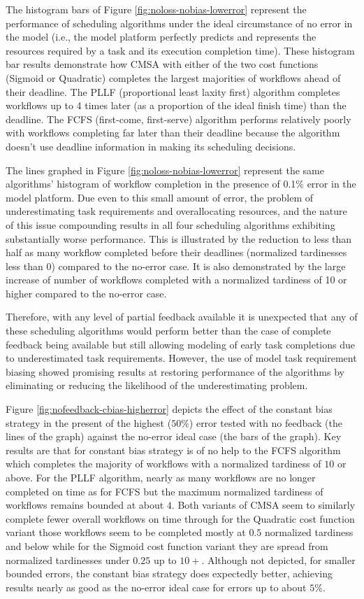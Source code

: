 \documentclass[10pt]{csce}
\begin{document}
The histogram bars of Figure \ref{fig:noloss-nobias-lowerror} represent the
performance of scheduling algorithms under the ideal circumstance of no error
in the model (i.e., the model platform perfectly predicts and represents the
resources required by a task and its execution completion time).  These
histogram bar results demonstrate how CMSA with either of the two
cost functions (Sigmoid or Quadratic) completes the largest majorities of
workflows ahead of their deadline.  The PLLF (proportional least laxity first)
algorithm completes workflows up to 4 times later (as a proportion of the
ideal finish time) than the deadline. The FCFS (first-come, first-serve)
algorithm performs relatively poorly with workflows completing far later than
their deadline because the algorithm doesn't use deadline information in making
its scheduling decisions.

The lines graphed in Figure \ref{fig:noloss-nobias-lowerror} represent the
same algorithms' histogram of workflow completion in the presence of 0.1\% error
in the model platform.  Due even to this small amount of error, the problem of
underestimating task requirements and overallocating resources, and the nature
of this issue compounding results in all four scheduling algorithms exhibiting
substantially worse performance.  This is illustrated by the reduction to less
than half as many workflow completed before their deadlines (normalized
tardinesses less than 0) compared to the no-error case.  It is also
demonstrated by the large increase of number of workflows completed with a
normalized tardiness of 10 or higher compared to the no-error case.

Therefore, with any level of partial feedback available it is unexpected that
any of these scheduling algorithms would perform better than the case of
complete feedback being available but still allowing modeling of early task
completions due to underestimated task requirements.  However, the use of
model task requirement biasing showed promising results at restoring
performance of the algorithms by eliminating or reducing the likelihood of
the underestimating problem.

Figure \ref{fig:nofeedback-cbias-higherror} depicts the effect of the constant
bias strategy in the present of the highest ($50\%$) error tested with no
feedback (the lines of the graph) against the no-error ideal case (the bars
of the graph).  Key results are that for constant bias strategy is of no
help to the FCFS algorithm which completes the majority of workflows with a
normalized tardiness of $10$ or above.  For the PLLF algorithm, nearly as
many workflows are no longer completed on time as for FCFS but the maximum
normalized tardiness of workflows remains bounded at about $4$.  Both
variants of CMSA seem to similarly complete fewer overall workflows on time
through for the Quadratic cost function variant those workflows seem to be
completed mostly at $0.5$ normalized tardiness and below while for the
Sigmoid cost function variant they are spread from normalized tardinesses
under $0.25$ up to $10+$. Although not depicted, for smaller bounded errors,
the constant bias strategy does expectedly better, achieving results nearly
as good as the no-error ideal case for errors up to about $5\%$.
\end{document}
